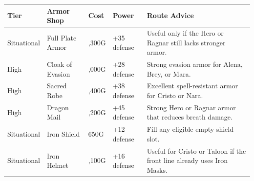 \documentclass[
  american,
  10pt,
  letterpaper,
  oneside,
  open=any]{scrreprt}
\newcounter{none} %
\newenvironment{guidetable}{%
  \small\setstretch{1.0}%
  \setlength{\tabcolsep}{4pt}%
  \setlength{\LTpre}{8pt}\setlength{\LTpost}{10pt}%
  \renewcommand{\arraystretch}{1.16}%
}{ }
\begin{document}
\begin{guidetable}

{\def\LTcaptype{none} %
\begin{longtable}[]{@{}
  >{\raggedright\arraybackslash}p{}
  >{\raggedright\arraybackslash}p{}
  >{\raggedleft\arraybackslash}p{}
  >{\raggedleft\arraybackslash}p{}
  >{\raggedright\arraybackslash}p{}@{}}
\toprule\noalign{}
\begin{minipage}[b]{\linewidth}\raggedright
\color{GuideGreen}\bfseries Tier
\end{minipage} & \begin{minipage}[b]{\linewidth}\raggedright
\color{GuideGreen}\bfseries Armor Shop
\end{minipage} & \begin{minipage}[b]{\linewidth}\raggedleft
\color{GuideGreen}\bfseries Cost
\end{minipage} & \begin{minipage}[b]{\linewidth}\raggedleft
\color{GuideGreen}\bfseries Power
\end{minipage} & \begin{minipage}[b]{\linewidth}\raggedright
\color{GuideGreen}\bfseries Route Advice
\end{minipage} \\
\midrule\noalign{}
\endhead
\bottomrule\noalign{}
\endlastfoot
Situational & Full Plate Armor & 2,300G & +35 defense & Useful only if
the Hero or Ragnar still lacks stronger armor. \\
High & Cloak of Evasion & 3,000G & +28 defense & Strong evasion armor
for Alena, Brey, or Mara. \\
High & Sacred Robe & 4,400G & +38 defense & Excellent spell-resistant
armor for Cristo or Nara. \\
High & Dragon Mail & 5,200G & +45 defense & Strong Hero or Ragnar armor
that reduces breath damage. \\
Situational & Iron Shield & 650G & +12 defense & Fill any eligible empty
shield slot. \\
Situational & Iron Helmet & 1,100G & +16 defense & Useful for Cristo or
Taloon if the front line already uses Iron Masks. \\
\end{longtable}
}

\end{guidetable}
\end{document}
